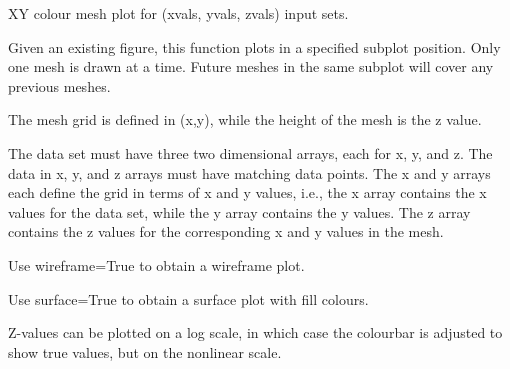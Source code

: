 \documentclass[a4paper,10pt,english]{sphinxmanual}
\begin{document}
\begin{fulllineitems}
\begin{fulllineitems}
\end{fulllineitems}


\begin{fulllineitems}
\label{ryplot:pyradi.ryplot.Plotter.mesh3D}
XY colour mesh plot for (xvals, yvals, zvals) input sets.

Given an existing figure, this function plots in a specified subplot position.
Only one mesh is drawn at a time.  Future meshes in the same subplot
will cover any previous meshes.

The mesh grid is defined in (x,y), while the height of the mesh is the z value.

The data set must have three two dimensional arrays, each for x, y, and z.  
The data in x, y, and z arrays must have matching data points.  
The x and y arrays each define the grid in terms of x and y values, i.e.,
the x array contains the x values for the data set, while the y array 
contains the y values.  The z array contains the z values for the 
corresponding x and y values in the mesh.

Use wireframe=True to obtain a wireframe plot.

Use surface=True to obtain a surface plot with fill colours.

Z-values can be plotted on a log scale, in which case the colourbar is adjusted
to show true values, but on the nonlinear scale.


\end{fulllineitems}
\end{fulllineitems}
\end{document}
